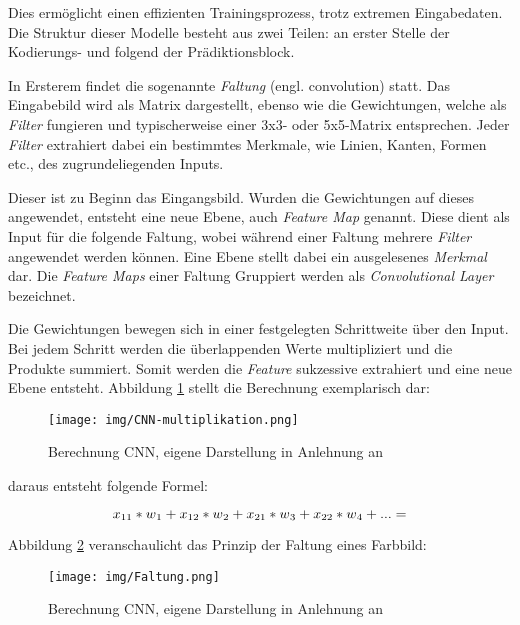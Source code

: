 Dies ermöglicht einen effizienten Trainingsprozess, trotz extremen Eingabedaten. \\

Die Struktur dieser Modelle besteht aus zwei Teilen: an erster Stelle der Kodierungs- und folgend der Prädiktionsblock.

In Ersterem findet die sogenannte \textit{Faltung} (engl. convolution) statt. Das Eingabebild wird als Matrix dargestellt, ebenso wie die Gewichtungen, welche als \textit{Filter} fungieren und typischerweise einer 3x3- oder 5x5-Matrix entsprechen. Jeder \textit{Filter} extrahiert dabei ein bestimmtes Merkmale, wie Linien, Kanten, Formen etc., des zugrundeliegenden Inputs.

Dieser ist zu Beginn das Eingangsbild. Wurden die Gewichtungen auf dieses angewendet, entsteht eine neue Ebene, auch \textit{Feature Map} genannt. Diese dient als Input für die folgende Faltung, wobei während einer Faltung mehrere \textit{Filter} angewendet werden können. Eine Ebene stellt dabei ein ausgelesenes \textit{Merkmal} dar.
Die \textit{Feature Maps} einer Faltung Gruppiert werden als \textit{Convolutional Layer} bezeichnet.

Die Gewichtungen bewegen sich in einer festgelegten Schrittweite über den Input. Bei jedem Schritt werden die überlappenden Werte multipliziert und die Produkte summiert. Somit werden die \textit{Feature} sukzessive extrahiert und eine neue Ebene entsteht. Abbildung \ref{fig:multiplikation} stellt die Berechnung exemplarisch dar: 
\cite[vgl.][]{27}
\begin{figure}[H]
	\centering
	\texttt{[image: img/CNN-multiplikation.png]}
	\caption{Berechnung CNN, eigene Darstellung in Anlehnung an \cite{28}}
	\label{fig:multiplikation}
\end{figure}

daraus entsteht folgende Formel:

\begin{equation} 
x\textsubscript{11} * w\textsubscript{1} +
x\textsubscript{12} * w\textsubscript{2} +
x\textsubscript{21} * w\textsubscript{3} +
x\textsubscript{22} * w\textsubscript{4} + ... =
\end{equation}

Abbildung \ref{fig:Faltung} veranschaulicht das Prinzip der Faltung eines Farbbild:

\begin{figure}[H]
	\centering
	\texttt{[image: img/Faltung.png]}
	\caption{Berechnung CNN, eigene Darstellung in Anlehnung an \cite{28}}
	\label{fig:Faltung}
\end{figure}

